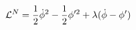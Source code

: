 \begin{equation}
 {\cal{L}}^N =\frac{1}{2}\dot{\phi}^2-\frac{1}{2}\phi'^2+\lambda(\dot{\phi}-\phi')
 \label{a52}
 \end{equation}

